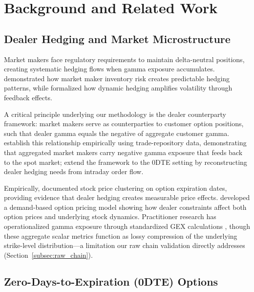 \section{Background and Related Work}
\label{sec:related}

\subsection{Dealer Hedging and Market Microstructure}

Market makers face regulatory requirements to maintain delta-neutral positions, creating systematic hedging flows when gamma exposure accumulates. \citet{grossman1988liquidity} demonstrated how market maker inventory risk creates predictable hedging patterns, while \citet{frey1997market} formalized how dynamic hedging amplifies volatility through feedback effects.

A critical principle underlying our methodology is the dealer counterparty framework: market makers serve as counterparties to customer option positions, such that dealer gamma equals the negative of aggregate customer gamma. \citet{anderegg2022impact} establish this relationship empirically using trade-repository data, demonstrating that aggregated market makers carry negative gamma exposure that feeds back to the spot market; \citet{adams2025zerodte} extend the framework to the 0DTE setting by reconstructing dealer hedging needs from intraday order flow.

Empirically, \citet{ni2005stock} documented stock price clustering on option expiration dates, providing evidence that dealer hedging creates measurable price effects. \citet{garleanu2009demand} developed a demand-based option pricing model showing how dealer constraints affect both option prices and underlying stock dynamics. Practitioner research has operationalized gamma exposure through standardized GEX calculations \citep{spotgamma2021,anderegg2022impact}, though these aggregate scalar metrics function as lossy compression of the underlying strike-level distribution---a limitation our raw chain validation directly addresses (Section~\ref{subsec:raw_chain}).

\subsection{Zero-Days-to-Expiration (0DTE) Options}

